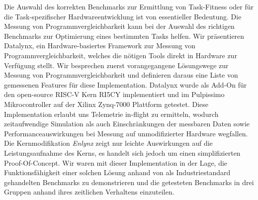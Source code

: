 Die Auswahl des korrekten Benchmarks zur Ermittlung von Task-Fitness oder für die Task-spezifischer Hardwareentwicklung ist von essentieller Bedeutung. Die Messung von Programmvergleichbarkeit kann bei der Auswahl des richtigen Benchmarks zur Optimierung eines bestimmten Tasks helfen. Wir präsentieren Datalynx, ein Hardware-basiertes Framework zur Messung von Programmvergleichbarkeit, welches die nötigen Tools direkt in Hardware zur Verfügung stellt. Wir besprechen zuerst vorangegangene Lösungswege zur Messung von Programmvergleichbarkeit und definieren daraus eine Liste von gemessenen Features für diese Implementation. Datalynx wurde als Add-On für den open-source RISC-V Kern RI5CY implementiert und im Pulpissimo Mikrocontroller auf der Xilinx Zynq-7000 Plattform getestet. Diese Implementation erlaubt uns Telemetrie in-flight zu ermitteln, wodurch zeitaufwendige Simulation als auch Einschränkungen der messbaren Daten sowie Performanceauswirkungen bei Messung auf unmodifizierter Hardware wegfallen. Die Kernmodifikation \emph{Enlynx} zeigt nur leichte Auswirkungen auf die Leistungsaufnahme des Kerns, es handelt sich jedoch um einen simplifizierten Proof-Of-Concept. Wir waren mit dieser Implementation in der Lage, die Funktionsfähigkeit einer solchen Lösung anhand von als Industriestandard gehandelten Benchmarks zu demonstrieren und die getesteten Benchmarks in drei Gruppen anhand ihres zeitlichen Verhaltens einzuteilen.